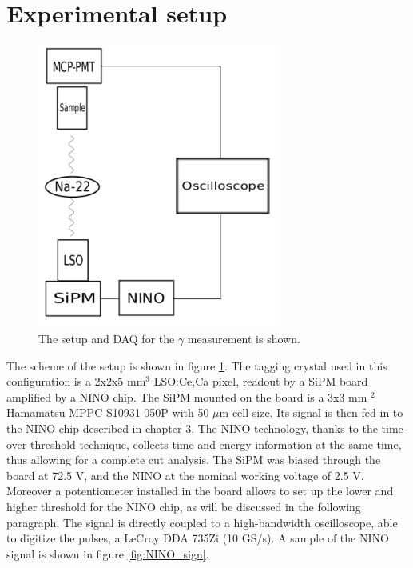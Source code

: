 \section{Experimental setup}

\begin{figure}[htbp]
\begin{center}
\includegraphics[width=8cm]{../Pictures/Chapter_8/electronics.pdf}
\end{center}
\caption[Setup for $\gamma$ measurement]{The setup and DAQ for the $\gamma$ measurement is shown.}
\label{fig:setup}
\end{figure}
The scheme of the setup is shown in figure \ref{fig:setup}.
The tagging crystal used in this configuration is a 2x2x5 mm$^{3}$ LSO:Ce,Ca pixel, readout by a SiPM board amplified by a NINO chip. 
The SiPM mounted on the board is a 3x3 mm $^{2}$ Hamamatsu MPPC S10931-050P with 50 $\mu$m cell size.
Its signal is then fed in to the NINO chip described in chapter 3. The NINO technology, thanks to the time-over-threshold technique, collects time and energy information at the same time, thus allowing for a complete cut analysis.
The SiPM was biased through the board at 72.5 V, and the NINO at the nominal working voltage of 2.5 V. Moreover a potentiometer installed in the board allows to set up the lower and higher threshold for the NINO chip, as will be discussed in the following paragraph.
The signal is directly coupled to a high-bandwidth oscilloscope, able to digitize the pulses, a LeCroy DDA 735Zi (10 GS/s).
A sample of the NINO signal is shown in figure \ref{fig:NINO_sign}.
